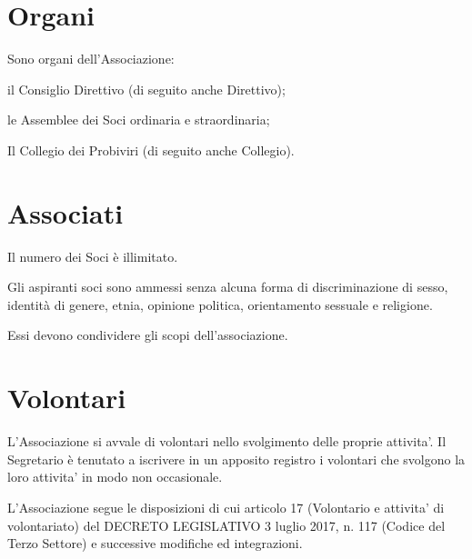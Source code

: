\documentclass[legalpaper, 11pt]{exam}
\let\tempone\enumerate
\let\temptwo\endenumerate
\renewenvironment{enumerate}{\tempone\addtolength{\itemsep}{-0.45\baselineskip}}{\temptwo}
\begin{document}
{\section{Organi}
Sono organi dell’Associazione: 
\vspace{-5pt}
\begin{enumerate}
 \item il Consiglio Direttivo (di seguito anche Direttivo);
 \item le Assemblee dei Soci ordinaria e straordinaria;
 \item Il Collegio dei Probiviri (di seguito anche Collegio).
\end{enumerate}

\section{Associati}
\begin{enumerate}
 \item Il numero dei Soci è illimitato. 
 \item Gli aspiranti soci sono ammessi senza alcuna forma di discriminazione di sesso, identità di genere, etnia, opinione politica, orientamento sessuale e religione.
 \item Essi devono condividere gli scopi dell’associazione.
\end{enumerate}

\section{Volontari}
\begin{enumerate}
\item L'Associazione si avvale di volontari  nello svolgimento delle proprie attivita'. Il Segretario è tenutato a iscrivere  in  un apposito registro i volontari che svolgono la loro attivita' in  modo non occasionale.
\item L'Associazione segue le disposizioni di cui articolo 17 (Volontario e attivita' di volontariato) del DECRETO LEGISLATIVO 3 luglio 2017, n. 117 (Codice del Terzo Settore) e successive modifiche ed integrazioni.
\end{enumerate}

}
\end{document}
